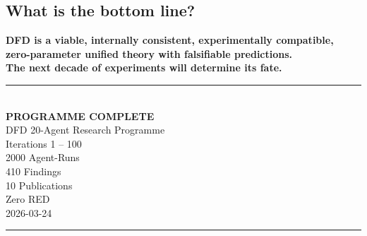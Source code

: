 \documentclass[11pt,a4paper]{article}
\begin{document}
\begin{tcolorbox}[colback=green!5!white, colframe=dfdgreen, title=\textbf{THE DEFINITIVE ANSWER}]
\subsection*{What is the bottom line?}

\begin{center}
\Large
\textbf{DFD is a viable, internally consistent, experimentally compatible,\\
zero-parameter unified theory with falsifiable predictions.\\[6pt]
The next decade of experiments will determine its fate.}
\end{center}
\end{tcolorbox}

\vspace{24pt}

\begin{center}
\rule{0.9\textwidth}{3pt}\\[18pt]
\Huge\textbf{PROGRAMME COMPLETE}\\[12pt]
\Large
DFD 20-Agent Research Programme\\
Iterations 1 -- 100\\
2000 Agent-Runs\\
410 Findings\\
10 Publications\\
Zero RED\\[12pt]
\normalsize
2026-03-24\\[18pt]
\rule{0.9\textwidth}{3pt}
\end{center}
\end{document}
